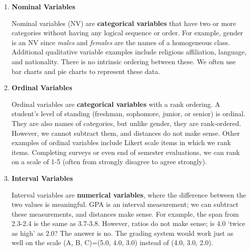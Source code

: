 \documentclass[11pt]{book}\usepackage[]{graphicx}\usepackage[]{color}
\begin{document}
\begin{enumerate}
\item \textbf{Nominal Variables}

Nominal variables (NV) are \textbf{categorical variables} that have two or more categories without having any logical sequence or order. For example, gender is an NV since \textit{males} and \textit{females} are the names of a homogeneous class.  Additional qualitative variable examples include religious affiliation, language, and nationality.   There is no intrinsic ordering between these.  We often use bar charts and pie charts to represent these data.


\item \textbf{Ordinal Variables}  

Ordinal variables are \textbf{categorical variables} with a rank ordering.  A student's level of standing (freshman, sophomore, junior, or senior) is ordinal.  They are also names of categories, but unlike gender, they are rank-ordered.   However, we cannot subtract them, and distances do not make sense.  Other examples of ordinal variables include Likert scale items in which we rank items.  Completing surveys or even end of semester evaluations, we can rank on a scale of 1-5 (often from strongly disagree to agree strongly).


\item \textbf{Interval Variables}

Interval variables are \textbf{numerical variables}, where the difference between the two values is meaningful.  GPA is an interval measurement; we can subtract these measurements, and distances make sense.  For example, the span from 2.3-2.4 is the same as 3.7-3.8.  However, ratios do not make sense; is 4.0 `twice as high' as 2.0?  The answer is no.  The grading system would work just as well on the scale (A, B, C)=(5.0, 4.0, 3.0) instead of (4.0, 3.0, 2.0).


\end{enumerate}
\end{document}
